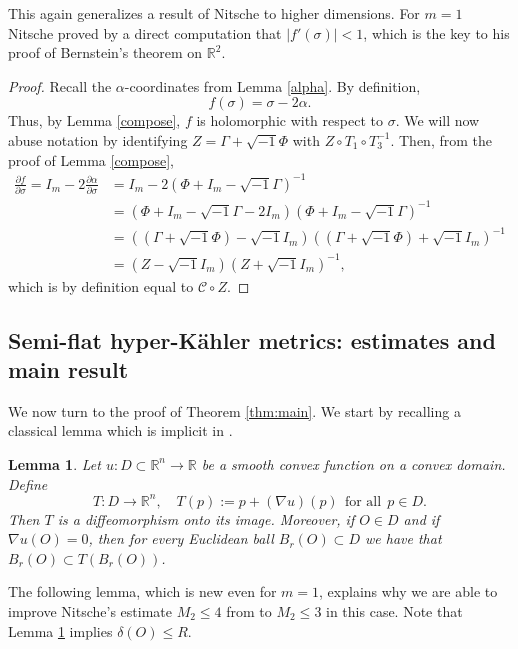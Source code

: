 \documentclass[11pt,reqno]{amsart}
\newcommand{\R}{\mathbb{R}}
\renewcommand{\leq}{\leqslant}
\theoremstyle{plain}
\newtheorem{lemma}[theorem]{Lemma}
\theoremstyle{definition}
\numberwithin{equation}{section}
\begin{document}
This again generalizes a result of Nitsche \cite{Nit} to higher dimensions. For $m = 1$ Nitsche proved by a direct computation that $|f'(\sigma)| < 1$, which is the key to his proof of Bernstein's theorem on $\mathbb{R}^2$.

\begin{proof}
    Recall the $\alpha$-coordinates from Lemma \ref{alpha}. By definition,
    $$f(\sigma)=\sigma-2\alpha.$$
    Thus, by Lemma \ref{compose}, $f$ is holomorphic with respect to $\sigma$. We will now abuse notation by identifying $Z=\Gamma+\sqrt{-1}\Phi$ with $Z \circ T_1 \circ T_3^{-1}$. Then, from the proof of Lemma \ref{compose},
    \begin{align*}\frac{\partial f}{\partial \sigma}=I_{m}-2\frac{\partial \alpha}{\partial \sigma} &= I_m - 2(\Phi+I_{m}-\sqrt{-1}\Gamma)^{-1}\\
         & =  (\Phi+I_{m}-\sqrt{-1}\Gamma-2I_{m})(\Phi+I_{m}-\sqrt{-1}\Gamma)^{-1}\\
         & =  ((\Gamma+\sqrt{-1}\Phi)-\sqrt{-1}I_{m})((\Gamma+\sqrt{-1}\Phi)+\sqrt{-1}I_{m})^{-1}\\
         & =  (Z-\sqrt{-1}I_{m})(Z+\sqrt{-1}I_{m})^{-1},
    \end{align*}
    which is by definition equal to $\mathscr{C} \circ Z$.
\end{proof}

\subsection{Semi-flat hyper-Kähler metrics: estimates and main result}

We now turn to the proof of Theorem \ref{thm:main}. We start by recalling a classical lemma which is implicit in \cite{Nit}.

\begin{lemma}\label{DT}
Let $u:D\subset \R^{n}\to \R$ be a smooth convex function on a convex domain. Define 
$$T: D \to \mathbb{R}^n, \quad T(p) := p + (\nabla u)(p)\;\,\text{for all}\;\,p \in D.$$ Then $T$ is a diffeomorphism onto its image. Moreover, if $O\in D$ and if $\nabla u(O)=0$, then for every Euclidean ball $B_{r}(O)\subset D$ we have that $B_{r}(O)\subset T(B_r(O))$.
\end{lemma}

The following lemma, which is new even for $m = 1$, explains why we are able to improve Nitsche's estimate $M_2 \leq 4$ from \cite{Nit} to $M_2 \leq 3$ in this case. Note that Lemma \ref{DT} implies $\delta(O) \leq R$.
\end{document}
